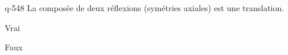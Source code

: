 \begin{truefalse}{q-548}
La composée de deux réflexions (symétries axiales) est une translation.
\item Vrai
\item* Faux
\end{truefalse}

